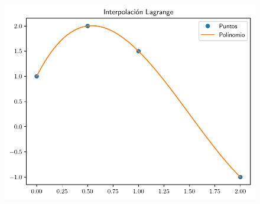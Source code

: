 
\begin{frame}
	\begin{solution}
		\begin{figure}[ht!]
			\centering
			\includegraphics[width=.8\paperwidth]{p7}
		\end{figure}
	\end{solution}
\end{frame}